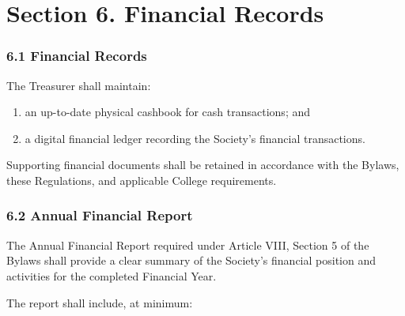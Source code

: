 \documentclass[a4paper]{article}
\begin{document}
\section*{Section 6. Financial Records}

\subsubsection*{6.1 Financial Records}
The Treasurer shall maintain:

\begin{enumerate}
    \item an up-to-date physical cashbook for cash transactions; and
    \item a digital financial ledger recording the Society's financial
    transactions.
\end{enumerate}

Supporting financial documents shall be retained in accordance with the
Bylaws, these Regulations, and applicable College requirements.

\subsubsection*{6.2 Annual Financial Report}
The Annual Financial Report required under Article VIII, Section 5 of
the Bylaws shall provide a clear summary of the Society's financial
position and activities for the completed Financial Year.

The report shall include, at minimum:
\end{document}
